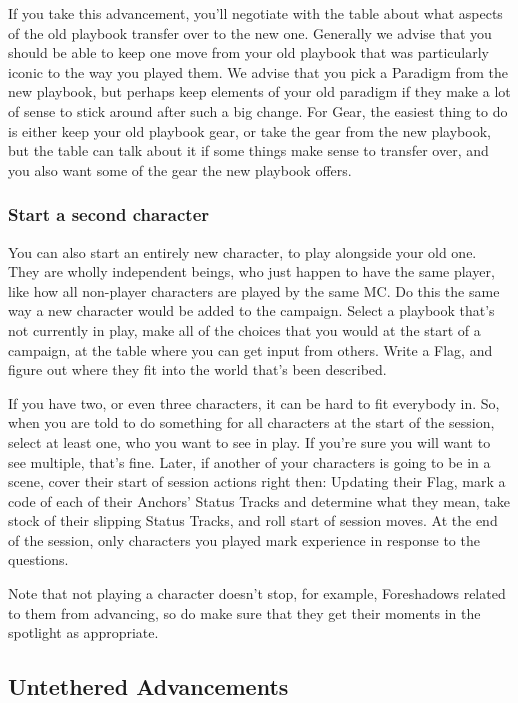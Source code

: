 \documentclass[10pt,twoside,openright]{memoir}
\begin{document}
If you take this advancement, you'll negotiate with the table about what
aspects of the old playbook transfer over to the new one. Generally we
advise that you should be able to keep one move from your old playbook
that was particularly iconic to the way you played them. We advise that
you pick a Paradigm from the new playbook, but perhaps keep elements of
your old paradigm if they make a lot of sense to stick around after such
a big change. For Gear, the easiest thing to do is either keep your old
playbook gear, or take the gear from the new playbook, but the table can
talk about it if some things make sense to transfer over, and you also
want some of the gear the new playbook offers.

\hypertarget{start-a-second-character}{%
\subsubsection{Start a second
character}\label{start-a-second-character}}

You can also start an entirely new character, to play alongside your old
one. They are wholly independent beings, who just happen to have the
same player, like how all non-player characters are played by the same
MC. Do this the same way a new character would be added to the campaign.
Select a playbook that's not currently in play, make all of the choices
that you would at the start of a campaign, at the table where you can
get input from others. Write a Flag, and figure out where they fit into
the world that's been described.

If you have two, or even three characters, it can be hard to fit
everybody in. So, when you are told to do something for all characters
at the start of the session, select at least one, who you want to see in
play. If you're sure you will want to see multiple, that's fine. Later,
if another of your characters is going to be in a scene, cover their
start of session actions right then: Updating their Flag, mark a code of
each of their Anchors' Status Tracks and determine what they mean, take
stock of their slipping Status Tracks, and roll start of session moves.
At the end of the session, only characters you played mark experience in
response to the questions.

Note that not playing a character doesn't stop, for example, Foreshadows
related to them from advancing, so do make sure that they get their
moments in the spotlight as appropriate.

\hypertarget{untethered-advancements-1}{%
\subsection{Untethered Advancements}\label{untethered-advancements-1}}
\end{document}
